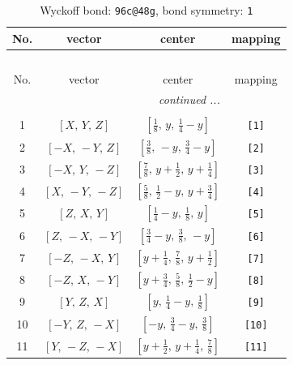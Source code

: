 \documentclass[fleqn,8pt]{jsarticle}
\begin{document}
\begin{longtable}{cccc}
\caption{Wyckoff bond: {\tt 96c@48g}, bond symmetry: {\tt 1}}
 \\
 \hline \hline
No. & vector & center & mapping \\ \hline \endfirsthead

\multicolumn{3}{l}{\tablename\ \thetable{}} \\
 \hline \hline
No. & vector & center & mapping \\ \hline \endhead

 \hline \hline
\multicolumn{3}{r}{\footnotesize\it continued ...} \\ \endfoot

 \hline \hline
\multicolumn{3}{r}{} \\ \endlastfoot

1 & $\left[ X,\, Y,\, Z \right]$ & $\left[ \frac{1}{8},\, y,\, \frac{1}{4} - y \right]$ & {\tt [1]} \\ \hline
2 & $\left[ - X,\, - Y,\, Z \right]$ & $\left[ \frac{3}{8},\, - y,\, \frac{3}{4} - y \right]$ & {\tt [2]} \\ \hline
3 & $\left[ - X,\, Y,\, - Z \right]$ & $\left[ \frac{7}{8},\, y + \frac{1}{2},\, y + \frac{1}{4} \right]$ & {\tt [3]} \\ \hline
4 & $\left[ X,\, - Y,\, - Z \right]$ & $\left[ \frac{5}{8},\, \frac{1}{2} - y,\, y + \frac{3}{4} \right]$ & {\tt [4]} \\ \hline
5 & $\left[ Z,\, X,\, Y \right]$ & $\left[ \frac{1}{4} - y,\, \frac{1}{8},\, y \right]$ & {\tt [5]} \\ \hline
6 & $\left[ Z,\, - X,\, - Y \right]$ & $\left[ \frac{3}{4} - y,\, \frac{3}{8},\, - y \right]$ & {\tt [6]} \\ \hline
7 & $\left[ - Z,\, - X,\, Y \right]$ & $\left[ y + \frac{1}{4},\, \frac{7}{8},\, y + \frac{1}{2} \right]$ & {\tt [7]} \\ \hline
8 & $\left[ - Z,\, X,\, - Y \right]$ & $\left[ y + \frac{3}{4},\, \frac{5}{8},\, \frac{1}{2} - y \right]$ & {\tt [8]} \\ \hline
9 & $\left[ Y,\, Z,\, X \right]$ & $\left[ y,\, \frac{1}{4} - y,\, \frac{1}{8} \right]$ & {\tt [9]} \\ \hline
10 & $\left[ - Y,\, Z,\, - X \right]$ & $\left[ - y,\, \frac{3}{4} - y,\, \frac{3}{8} \right]$ & {\tt [10]} \\ \hline
11 & $\left[ Y,\, - Z,\, - X \right]$ & $\left[ y + \frac{1}{2},\, y + \frac{1}{4},\, \frac{7}{8} \right]$ & {\tt [11]} \\ \hline

\end{longtable}
\end{document}
